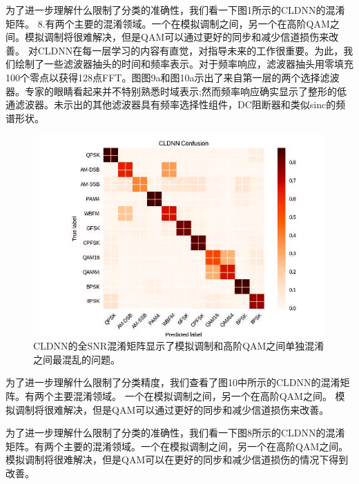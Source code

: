 为了进一步理解什么限制了分类的准确性，我们看一下图1所示的CLDNN的混淆矩阵。 8.有两个主要的混淆领域。一个在模拟调制之间，另一个在高阶QAM之间。模拟调制将很难解决，但是QAM可以通过更好的同步和减少信道损伤来改善。
对CLDNN在每一层学习的内容有直觉，对指导未来的工作很重要。为此，我们绘制了一些滤波器抽头的时间和频率表示。对于频率响应，滤波器抽头用零填充100个零点以获得128点FFT。图图9a和图10a示出了来自第一层的两个选择滤波器。专家的眼睛看起来并不特别熟悉时域表示;然而频率响应确实显示了整形的低通滤波器。未示出的其他滤波器具有频率选择性组件，DC阻断器和类似sinc的频谱形状。
\begin{figure}[!h]
	\centering
	\includegraphics[scale=1]{figures/chapter_5/fig8}
	\caption{CLDNN的全SNR混淆矩阵显示了模拟调制和高阶QAM之间单独混淆之间最混乱的问题。}
\end{figure}

为了进一步理解什么限制了分类精度，我们查看了图10中所示的CLDNN的混淆矩阵。有两个主要混淆领域。 一个在模拟调制之间，另一个在高阶QAM之间。 模拟调制将很难解决，但是QAM可以通过更好的同步和减少信道损伤来改善。\par

为了进一步理解什么限制了分类的准确性，我们看一下图8所示的CLDNN的混淆矩阵。有两个主要的混淆领域。一个在模拟调制之间，另一个在高阶QAM之间。模拟调制将很难解决，但是QAM可以在更好的同步和减少信道损伤的情况下得到改善。\par



